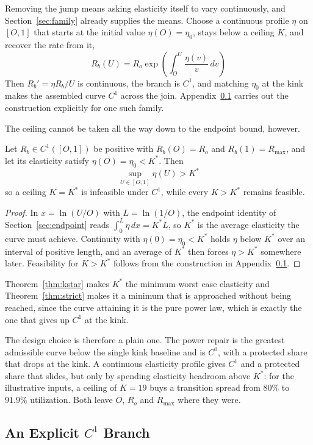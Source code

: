 \documentclass[11pt,a4paper]{article}
\begin{document}
Removing the jump means asking elasticity itself to vary continuously, and Section~\ref{sec:family} already supplies the means. Choose a continuous profile $\eta$ on $[O,1]$ that starts at the initial value $\eta(O)=\eta_0$, stays below a ceiling $K$, and recover the rate from it,
\[
R_b(U)=R_o\exp\left(\int_O^U\frac{\eta(v)}{v}\,dv\right)
\]
Then $R_b'=\eta R_b/U$ is continuous, the branch is $C^1$, and matching $\eta_0$ at the kink makes the assembled curve $C^1$ across the join. Appendix~\ref{app:smoothstep} carries out the construction explicitly for one such family.

The ceiling cannot be taken all the way down to the endpoint bound, however.

\begin{theorem}
\label{thm:strict}
Let $R_b\in C^1([O,1])$ be positive with $R_b(O)=R_o$ and $R_b(1)=R_{\max}$, and let its elasticity satisfy $\eta(O)=\eta_0<K^*$. Then
\[
\boxed{\sup_{U\in[O,1]}\eta(U)>K^*}
\]
so a ceiling $K=K^*$ is infeasible under $C^1$, while every $K>K^*$ remains feasible.
\end{theorem}
\begin{proof}
In $x=\ln(U/O)$ with $L=\ln(1/O)$, the endpoint identity of Section~\ref{sec:endpoint} reads $\int_0^L\eta\,dx=K^*L$, so $K^*$ is the average elasticity the curve must achieve. Continuity with $\eta(0)=\eta_0<K^*$ holds $\eta$ below $K^*$ over an interval of positive length, and an average of $K^*$ then forces $\eta>K^*$ somewhere later. Feasibility for $K>K^*$ follows from the construction in Appendix~\ref{app:smoothstep}.
\end{proof}

Theorem~\ref{thm:kstar} makes $K^*$ the minimum worst case elasticity and Theorem~\ref{thm:strict} makes it a minimum that is approached without being reached, since the curve attaining it is the pure power law, which is exactly the one that gives up $C^1$ at the kink.

The design choice is therefore a plain one. The power repair is the greatest admissible curve below the single kink baseline and is $C^0$, with a protected share that drops at the kink. A continuous elasticity profile gives $C^1$ and a protected share that slides, but only by spending elasticity headroom above $K^*$: for the illustrative inputs, a ceiling of $K=19$ buys a transition spread from $80\%$ to $91.9\%$ utilization. Both leave $O$, $R_o$ and $R_{\max}$ where they were.

\subsection{An Explicit \texorpdfstring{$C^1$}{C1} Branch}
\label{app:smoothstep}
\end{document}

